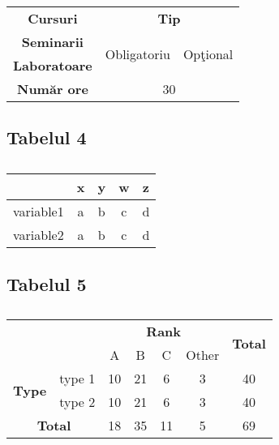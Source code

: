 \documentclass{article}
\begin{document}
\begin{table}[htbp]
	\centering
	\begin{tabular}{|c|c|c|}
		\hline
		\textbf{Cursuri} & \multicolumn{2}{c|}{\textbf{Tip}} \\
		\cline{2-3}
		\textbf{Seminarii} & \multirow{2}{*}{Obligatoriu} & \multirow{2}{*}{Opţional} \\
		\textbf{Laboratoare} &  &\\
		\hline
		\hline
		\textbf{Număr ore} & \multicolumn{2}{c|}{30} \\
		\hline
	\end{tabular}
	\caption{}
	\label{tabel3}
\end{table}

\subsection*{Tabelul 4}

\begin{table}[htbp]
	\centering
	\begin{tabular}{c c c c c}
		\hline
		& x & y & w & z\\
		\hline
		\multicolumn{1}{c|}{variable1} & \multicolumn{1}{c|}{a} & \multicolumn{1}{c|}{b} & \multicolumn{1}{c|}{c} & d \\
		\multicolumn{1}{c|}{variable2} & \multicolumn{1}{c|}{a} & \multicolumn{1}{c|}{b} & \multicolumn{1}{c|}{c} & d \\
		\hline
	\end{tabular}
	\caption{}
	\label{tabel4}
\end{table}

\subsection*{Tabelul 5}

\begin{table}[htbp]
	\centering
	\begin{tabular}{|c| c| c| c| c| c| c|}
		\hline
		\multicolumn{2}{|c|}{\multirow{2}{*}{}} & \multicolumn{4}{c|}{\textbf{Rank}} & \multirow{2}{*}{\textbf{Total}} \\
		\cline{3-6}
		\multicolumn{1}{|c}{}& & A & B & C& Other & \\
		\hline

		\multirow{2}{*}{\textbf{Type}} & type 1& 10 & 21 & 6 & 3& 40 \\
		\cline{2-7}
		& type 2 & 10 & 21 & 6 & 3 & 40 \\
		\hline
		\multicolumn{2}{|c|}{\textbf{Total}} & 18  & 35 & 11 & 5 & 69 \\
		\hline
	\end{tabular}
	\caption{}
	\label{tabel5}
\end{table}
\end{document}
